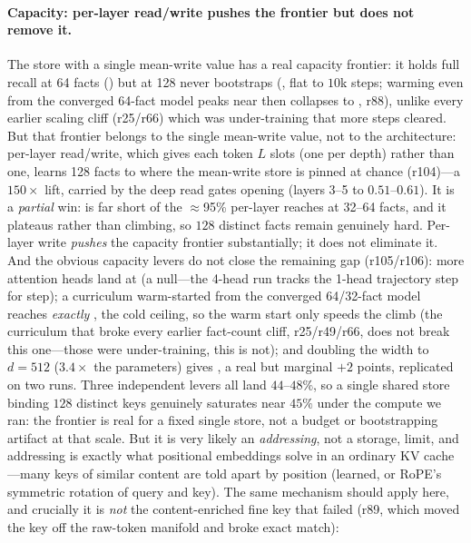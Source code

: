 \paragraph{Capacity: per-layer read/write pushes the frontier but does not remove it.}
The store with a single mean-write value has a real capacity frontier: it holds full recall
at 64 facts () but at 128 never bootstraps (, flat to $10$k steps;
warming even from the converged 64-fact model peaks near  then collapses to
, r88), unlike every earlier scaling cliff (r25/r66) which was under-training that
more steps cleared. But that frontier belongs to the single mean-write value, not to the
architecture: per-layer read/write, which gives each token $L$ slots (one per depth) rather
than one, learns 128 facts to  where the mean-write store is pinned at chance
(r104)---a $150\times$ lift, carried by the deep read gates opening (layers 3--5 to
$0.51$--$0.61$). It is a \emph{partial} win:  is far short of the $\approx$95\%
per-layer reaches at 32--64 facts, and it plateaus rather than climbing, so $128$ distinct
facts remain genuinely hard. Per-layer write \emph{pushes} the capacity frontier
substantially; it does not eliminate it. And the obvious capacity levers do not close the
remaining gap (r105/r106): more attention heads land at  (a null---the 4-head
run tracks the 1-head trajectory step for step); a curriculum warm-started from the
converged 64/32-fact model reaches \emph{exactly} , the cold ceiling, so the
warm start only speeds the climb (the curriculum that broke every earlier fact-count cliff,
r25/r49/r66, does not break this one---those were under-training, this is not); and doubling
the width to $d{=}512$ ($3.4\times$ the parameters) gives , a real but marginal
$+2$ points, replicated on two runs. Three independent levers all land $44$--$48\%$, so a
single shared store binding $128$ distinct keys genuinely saturates near $45\%$ under the
compute we ran: the frontier is real for a fixed single store, not a budget or bootstrapping
artifact at that scale. But it is very likely an \emph{addressing}, not a storage, limit, and
addressing is exactly what positional embeddings solve in an ordinary KV cache---many keys of
similar content are told apart by position (learned, or RoPE's symmetric rotation of query and
key). The same mechanism should apply here, and crucially it is \emph{not} the content-enriched
fine key that failed (r89, which moved the key off the raw-token manifold and broke exact match):
